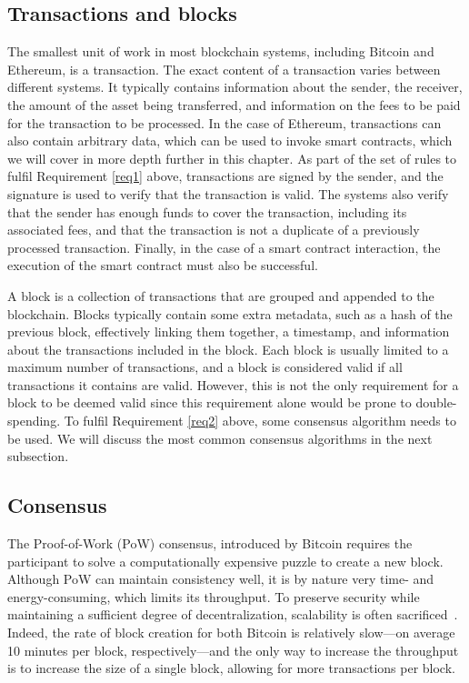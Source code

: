 \subsection{Transactions and blocks}
 The smallest unit of work in most blockchain systems, including Bitcoin and Ethereum, is a transaction.
The exact content of a transaction varies between different systems. It typically contains information about the sender, the receiver, the amount of the asset being transferred, and information on the fees to be paid for the transaction to be processed.
In the case of Ethereum, transactions can also contain arbitrary data, which can be used to invoke smart contracts, which we will cover in more depth further in this chapter.
As part of the set of rules to fulfil Requirement \ref{req1} above, transactions are signed by the sender, and the signature is used to verify that the transaction is valid.
The systems also verify that the sender has enough funds to cover the transaction, including its associated fees, and that the transaction is not a duplicate of a previously processed transaction.
Finally, in the case of a smart contract interaction, the execution of the smart contract must also be successful.

A block is a collection of transactions that are grouped and appended to the blockchain.
Blocks typically contain some extra metadata, such as a hash of the previous block, effectively linking them together, a timestamp, and information about the transactions included in the block.
Each block is usually limited to a maximum number of transactions, and a block is considered valid if all transactions it contains are valid.
However, this is not the only requirement for a block to be deemed valid since this requirement alone would be prone to double-spending.
To fulfil Requirement \ref{req2} above, some consensus algorithm needs to be used.
We will discuss the most common consensus algorithms in the next subsection.

\subsection{Consensus}
The Proof-of-Work (PoW) consensus, introduced by Bitcoin requires the participant to solve a computationally expensive puzzle to create a new block. Although PoW can maintain consistency well, it is by nature very time- and energy-consuming, which limits its throughput.
To preserve security while maintaining a sufficient degree of decentralization, scalability is often sacrificed~\cite{xie2019}.
Indeed, the rate of block creation for both Bitcoin is relatively slow---on average 10 minutes per block, respectively---and the only way to increase the throughput is to increase the size of a single block, allowing for more transactions per block.

